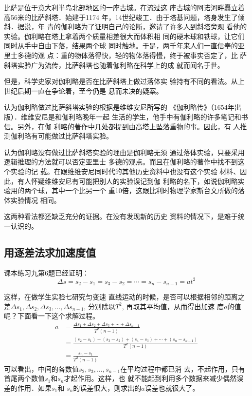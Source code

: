 比萨是位于意大利半岛北部地区的一座古城。在流过这
座古城的阿诺河畔矗立着高56米的比萨斜塔．始建于1174
年，14世纪竣工．由于塔基问题，塔身发生了倾斜．据说，年
青的伽利略为了证明自己的论断，邀请了许多人到斜塔旁观
看他的实验。伽利略在塔上拿着两个质量相差很大而体积相
同的硬木球和铁球，让它们同时从手中自由下落，结果两个球
同时触地。于是，两千年来人们一直信奉的亚里士多德的观
点：重的物体落得快，轻的物体落得慢，终于被事实否定了，比
萨斜塔实验广为流传，比萨斜塔也随着伽利略在科学上的成
就而闻名于世。

但是，科学史家对伽利略是否在比萨斜塔上做过落体实
验持有不同的看法。从上世纪后期一直在争论着，至今仍是
悬而未决的疑案。

认为伽利略做过比萨斜塔实验的根据是维维安尼所写的
《伽利略传》（1654年出版）．维维安尼是和伽利略晚年一起
生活的学生，他手中有伽利略的许多笔记和书信。另外，在伽
利略的著作中几处都提到由高塔上坠落重物的事。因此，有
人推测伽利略有可能做过比萨斜塔实验。

认为伽利略没有做过比萨斜塔实验的理由是伽利略无须
通过落体实验，只要采用逻辑推理的方法就可以否定亚里士
多德的观点。而且在伽利略的著作中找不到这个实验的记
载。在跟维维安尼同时代的其他历史资料中也没有这个实验
材料、因此，有人怀疑维维安尼有可能把别人的实验误记到伽
利略的名下，如说伽利略实验用的两个球，其中一个比另一个
重10倍，这跟比利时物理学家斯台文所做的落体实验情况
相同。

这两种看法都还缺乏充分的证据。在没有发现新的历史
资料的情况下，是难于统一认识的。

\subsection{用逐差法求加速度值}
课本练习九第6题已经证明：$$\Delta s=s_2-s_1=s_3-
s_2=\cdots=s_n-s_{n-1}=at^2$$ 

这样，在做学生实验七研究匀变速
直线运动的时候，是否可以根据相邻的距离之差$\Delta s_1,\Delta s_2,\Delta s_3,\ldots,\Delta s_{n-1}$, 分别除以$T^2$, 再取其平均值，从而得出加速
度$a$的值呢？下面看一下这个求解过程。
\[\begin{split}
    a&=\frac{\Delta s_1+\Delta s_2+\Delta s_3+\cdots+\Delta s_{n-1}}{T^2(n-1)}\\
    &=\frac{(s_2-s_1)+(s_3-s_2)+(s_4-s_3)+\cdots+(s_n-s_{n-1})}{T^2(n-1)}\\
    &=\frac{s_n-s_1}{T^2(n-1)}
\end{split}\]
可以看出，中间的各数值$s_2,s_3,\ldots, s_{n-1}$在平均过程中都已消
去，不起作用，只有首尾两个数值$s_1$和$s_n$才起作用。这样，也
就不能起到利用多个数据来减少偶然误差的作用．如果$s_1$和
$s_n$的误差很大，则求出的$a$误差也就很大了。

